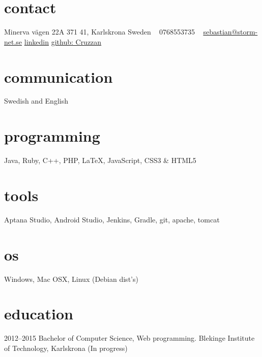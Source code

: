 \documentclass[]{friggeri-cv} %
\begin{document}


\begin{aside} %
\section{contact}
Minerva vägen 22A
371 41, Karlskrona
Sweden
~
0768553735
~
\href{mailto:sebastian@storm-net.se}{sebastian@storm-net.se}
\href{https://se.linkedin.com/pub/sebastian-hultstrand/60/51a/151}{linkedin}
\href{https://github.com/cruzzan}{github: Cruzzan}
\section{communication}
Swedish and English
\section{programming}
Java, Ruby, C++, PHP, LaTeX, JavaScript, CSS3 \& HTML5
\section{tools}
Aptana Studio, Android Studio, Jenkins, Gradle, git, apache, tomcat
\section{os}
Windows, Mac OSX, Linux (Debian dist's)
\end{aside}


\section{education}

\begin{entrylist}
\entry
{2012--2015}
{Bachelor of Computer Science, Web programming.}
{Blekinge Institute of Technology, Karlskrona (In progress)}
{}
\end{entrylist}
\end{document}
